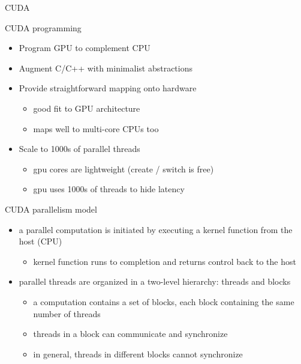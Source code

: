 \documentclass[10pt,t]{beamer}
\begin{document}
  \begin{frame}[standout]{}
    \centering
    CUDA
  \end{frame}

  \begin{frame}{CUDA programming}
    \begin{itemize}
      \item Program GPU to complement CPU
      \item Augment C/C++ with minimalist abstractions
      \item Provide straightforward mapping onto hardware
        \begin{itemize}
          \item good fit to GPU architecture
          \item maps well to multi-core CPUs too
        \end{itemize}
      \item Scale to 1000s of parallel threads
        \begin{itemize}
          \item gpu cores are lightweight (create / switch is free)
          \item gpu uses 1000s of threads to hide latency
        \end{itemize}
    \end{itemize}
  \end{frame}

  \begin{frame}{CUDA parallelism model}
    \begin{itemize}
      \item a parallel computation is initiated by executing a kernel function
        from the host (CPU)
        \begin{itemize}
          \item kernel function runs to completion and returns control back to
            the host
        \end{itemize}
      \item parallel threads are organized in a two-level hierarchy: threads and
        blocks
        \begin{itemize}
          \item a computation contains a set of blocks, each block containing
            the same number of threads
          \item threads in a block can communicate and synchronize
          \item in general, threads in different blocks cannot synchronize
        \end{itemize}
    \end{itemize}
  \end{frame}
\end{document}
